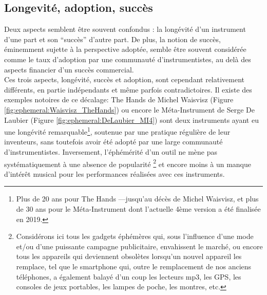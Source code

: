 \subsection{Longevité, adoption, succès}
Deux aspects semblent être souvent confondus : la longévité d'un instrument d'une part et son ``succès'' d'autre part. De plus, la notion de succès, éminemment sujette à la perspective adoptée, semble être souvent considérée comme le taux d'adoption par une communauté d'instrumentistes, au delà des aspects financier d'un succès commercial.\\
\indent Ces trois aspects, longévité, succès et adoption, sont cependant relativement différents, en partie indépendants et même parfois contradictoires. Il existe des exemples notoires de ce décalage: The Hands de Michel Waisvisz \cite{torre_hands:_2016} (Figure \ref{fig:ephemeral:Waisvisz_TheHands}) ou encore le Méta-Instrument de Serge De Laubier \cite{couprie_meta-instrument:_2018} (Figure \ref{fig:ephemeral:DeLaubier_MI4}) sont deux instruments ayant eu une longévité remarquable\footnote{Plus de 20 ans pour The Hands —jusqu'au décès de Michel Waisvisz, et plus de 30 ans pour le Méta-Instrument dont l'actuelle 4ème version a été finalisée en 2019.}, soutenue par une pratique régulière de leur inventeurs, sans toutefois avoir été adopté par une large communauté d'instrumentistes. Inversement, l'éphémérité d'un outil ne mène pas systématiquement à une absence de popularité \footnote{Considérons ici tous les gadgets éphémères qui, sous l'influence d'une mode et/ou d'une puissante campagne publicitaire, envahissent le marché, ou encore tous les appareils qui deviennent obsolètes lorsqu'un nouvel appareil les remplace, tel que le smartphone qui, outre le remplacement de nos anciens téléphones, a également balayé d'un coup les lecteurs mp3, les GPS, les consoles de jeux portables, les lampes de poche, les montres, etc.} et encore moins à un manque d'intérêt musical pour les performances réalisées avec ces instruments.

